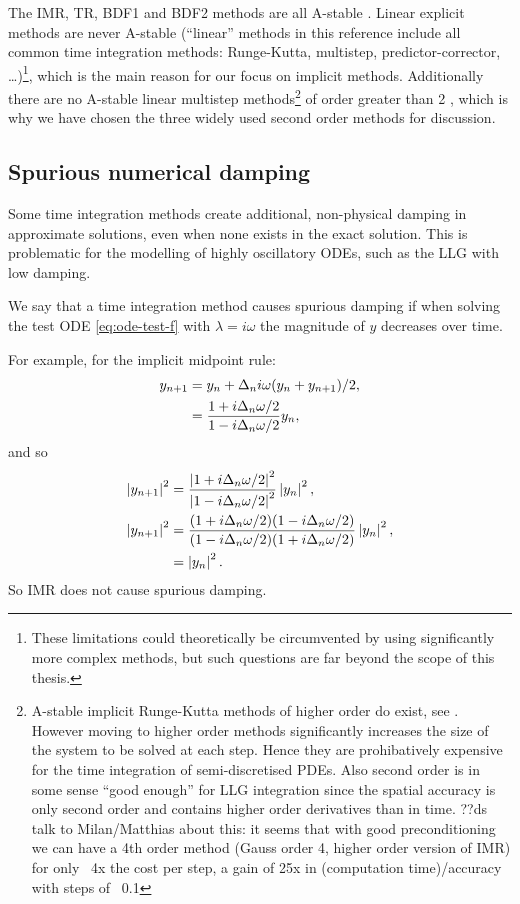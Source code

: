 The IMR, TR, BDF1 and BDF2 methods are all A-stable \cite[pgs. 43, 251]{HairerWanner}.
Linear explicit methods are never A-stable \cite{Nevanlinna1974} (``linear'' methods in this reference include all common time integration methods: Runge-Kutta, multistep, predictor-corrector, \ldots)\footnote{These limitations could theoretically be circumvented by using significantly more complex methods, but such questions are far beyond the scope of this thesis.}, which is the main reason for our focus on implicit methods.
Additionally there are no A-stable linear multistep methods\footnote{A-stable implicit Runge-Kutta methods of higher order do exist, see \eg \cite[73]{HairerWanner}.
However moving to higher order methods significantly increases the size of the system to be solved at each step. Hence they are prohibatively expensive for the time integration of semi-discretised PDEs.
Also second order is in some sense ``good enough'' for LLG integration since the spatial accuracy is only second order and contains higher order derivatives than in time.
??ds talk to Milan/Matthias about this: it seems that with good preconditioning we can have \eg a 4th order method (Gauss order 4, higher order version of IMR) for only ~4x the cost per step, a gain of 25x in (computation time)/accuracy with steps of ~0.1} of order greater than 2 \cite[261]{GreshoSani}, which is why we have chosen the three widely used second order methods for discussion.

\subsection{Spurious numerical damping}
\label{sec:numerical-damping}

Some time integration methods create additional, non-physical damping in approximate solutions, even when none exists in the exact solution.
This is problematic for the modelling of highly oscillatory ODEs, such as the LLG with low damping.

We say that a time integration method causes spurious damping if when solving the test ODE \cref{eq:ode-test-f} with $\lambda = i\omega$ the magnitude of $y$ decreases over time.

For example, for the implicit midpoint rule:
\begin{equation}
  \begin{aligned}
    y_{n+1} &= y_n + \Delta_{n} i \omega (y_n + y_{n+1})/2, \\
    &= \frac{1 + i\Delta_{n} \omega/2}{1 - i\Delta_{n} \omega/2} y_n,
  \end{aligned}
\end{equation}
and so
\begin{equation}
  \begin{aligned}
    \left|{y_{n+1}} \right|^2 &=  \frac{\left|{1 + i\Delta_{n} \omega/2} \right|^2}{\left|{1 - i\Delta_{n} \omega/2} \right|^2} \left|{y_n} \right|^2, \\
    \left|{y_{n+1}} \right|^2 &=  \frac{(1 + i\Delta_{n} \omega/2)(1 - i\Delta_{n} \omega/2)}
    {(1 - i\Delta_{n} \omega/2)(1 + i\Delta_{n} \omega/2)} \left|{y_n} \right|^2, \\
    &=  \left|{y_n} \right|^2.
  \end{aligned}
\end{equation}
So IMR does not cause spurious damping.

